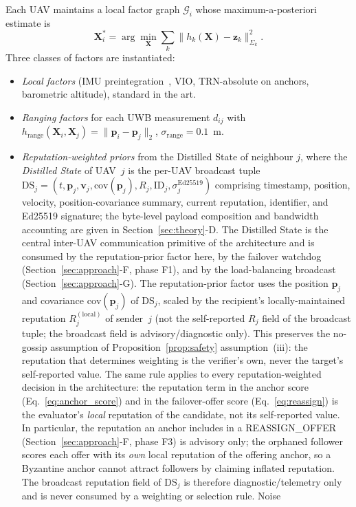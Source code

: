 \documentclass[journal,10pt,twocolumn]{IEEEtran}
\begin{document}
Each UAV maintains a local factor graph $\mathcal{G}_i$ whose maximum-a-posteriori estimate is
\begin{equation}
\mathbf{X}_i^* = \arg\min_{\mathbf{X}} \sum_k \lVert h_k(\mathbf{X}) - \mathbf{z}_k \rVert^2_{\Sigma_k}.
\end{equation}
Three classes of factors are instantiated:
\begin{itemize}
    \item \emph{Local factors} (IMU preintegration~\cite{forster2017preintegration}, VIO, TRN-absolute on anchors, barometric altitude), standard in the art.
    \item \emph{Ranging factors} for each UWB measurement $d_{ij}$ with $h_\text{range}(\mathbf{X}_i, \mathbf{X}_j) = \lVert \mathbf{p}_i - \mathbf{p}_j \rVert_2$, $\sigma_\text{range} = 0.1$~m.
    \item \emph{Reputation-weighted priors} from the Distilled State of neighbour $j$, where the \emph{Distilled State} of UAV~$j$ is the per-UAV broadcast tuple $\mathrm{DS}_j = (t, \mathbf{p}_j, \mathbf{v}_j, \mathrm{cov}(\mathbf{p}_j), R_j, \mathrm{ID}_j, \sigma_j^{\mathrm{Ed25519}})$ comprising timestamp, position, velocity, position-covariance summary, current reputation, identifier, and Ed25519 signature; the byte-level payload composition and bandwidth accounting are given in Section~\ref{sec:theory}-D. The Distilled State is the central inter-UAV communication primitive of the architecture and is consumed by the reputation-prior factor here, by the failover watchdog (Section~\ref{sec:approach}-F, phase F1), and by the load-balancing broadcast (Section~\ref{sec:approach}-G). The reputation-prior factor uses the position $\mathbf{p}_j$ and covariance $\mathrm{cov}(\mathbf{p}_j)$ of $\mathrm{DS}_j$, scaled by the recipient's locally-maintained reputation $R_{j}^{(\mathrm{local})}$ of sender~$j$ (not the self-reported $R_j$ field of the broadcast tuple; the broadcast field is advisory/diagnostic only). This preserves the no-gossip assumption of Proposition~\ref{prop:safety} assumption~(iii): the reputation that determines weighting is the verifier's own, never the target's self-reported value. The same rule applies to every reputation-weighted decision in the architecture: the reputation term in the anchor score (Eq.~\ref{eq:anchor_score}) and in the failover-offer score (Eq.~\ref{eq:reassign}) is the evaluator's \emph{local} reputation of the candidate, not its self-reported value. In particular, the reputation an anchor includes in a REASSIGN\_OFFER (Section~\ref{sec:approach}-F, phase F3) is advisory only; the orphaned follower scores each offer with its \emph{own} local reputation of the offering anchor, so a Byzantine anchor cannot attract followers by claiming inflated reputation. The broadcast reputation field of DS$_j$ is therefore diagnostic/telemetry only and is never consumed by a weighting or selection rule. Noise

\end{itemize}
\end{document}
